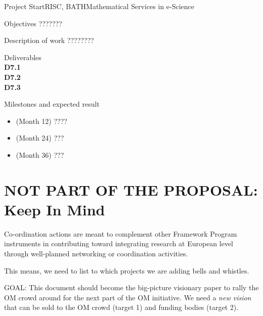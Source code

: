 \documentclass{euproposal}
\begin{document}
\begin{workpackage}{36}{7}{Project Start}{RISC, BATH}{Mathematical Services in e-Science}
\begin{wpbox}{Objectives}
  ???????
\end{wpbox}
\begin{wpbox}{Description of work}
  ????????
\end{wpbox}
\begin{wpbox}{Deliverables\\}
{\bf D7.1} \\
{\bf D7.2} \\
{\bf D7.3} 
\end{wpbox}
\begin{wpbox}{Milestones and expected result}
\begin{itemize}
\item (Month 12) ????
\item (Month 24) ???
\item (Month 36) ???
\end{itemize}
\end{wpbox}
\end{workpackage}

\newpage

\section{NOT PART OF THE PROPOSAL:  Keep In Mind}
Co-ordination actions are meant to complement other Framework Program
instruments in contributing toward integrating research at European
level through well-planned networking or coordination activities.

This means, we need to list to which projects we are adding bells and
whistles.

GOAL: This document should become the big-picture visionary paper to
rally the OM crowd around for the next part of the OM initiative.  We
need a \emph{new vision} that can be sold to the OM crowd (target 1)
and funding bodies (target 2).
\end{document}
